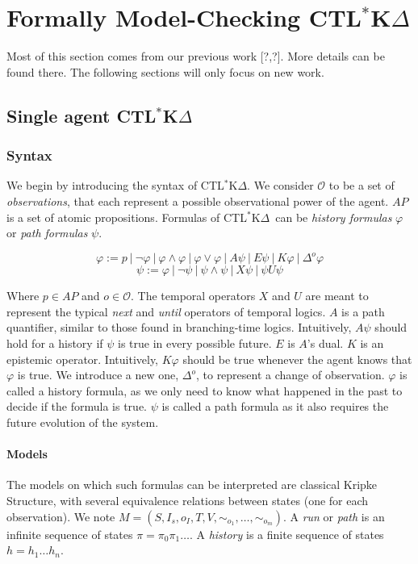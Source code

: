 \documentclass[dvipsnames]{acmart}
\def\ctlskd{CTL$^{*}$K$\Delta$}
\def\A{\mathit{A}}
\def\E{\mathit{E}}
\def\U{\mathit{U}}
\def\X{\mathit{X}}
\def\K{\mathit{K}}
\def\D#1{\Delta^{#1}}
\def\eqstate#1{\sim_{#1}}
\begin{document}
\section{Formally Model-Checking \ctlskd}
Most of this section comes from our previous work [?,?]. More details can be found there.
The following sections will only focus on new work.

\subsection{Single agent \ctlskd}
\subsubsection{Syntax}

We begin by introducing the syntax of \ctlskd. 
We consider $\mathcal{O}$ to be a set of \textit{observations}, that each represent a possible observational power of the agent. $\mathit{AP}$ is a set of atomic propositions.
Formulas of \ctlskd\ can be \textit{history formulas} $\varphi$ or \textit{path formulas} $\psi$.

$$\varphi := p ~|~ \neg \varphi ~|~ \varphi\wedge\varphi ~|~ \varphi\vee\varphi ~|~ \A\psi ~|~ \E\psi ~|~ \K\varphi ~|~ \D{o}\varphi$$
$$\psi := \varphi ~|~ \neg\psi ~|~ \psi\wedge\psi ~|~ \X\psi ~|~ \psi\U\psi$$

Where $p\in\mathit{AP}$ and $o\in\mathcal{O}$.
The temporal operators $\X$ and $\U$ are meant to represent the typical \textit{next} and \textit{until} operators of temporal logics.
$\A$ is a path quantifier, similar to those found in branching-time logics. Intuitively, $\A\psi$ should hold for a history if $\psi$ is true in every possible future. $\E$ is $\A$'s dual.
$\K$ is an epistemic operator. Intuitively, $\K\varphi$ should be true whenever the agent knows that $\varphi$ is true. We introduce a new one, $\D{o}$, to represent a change of observation.
$\varphi$ is called a history formula, as we only need to know what happened in the past to decide if the formula is true. $\psi$ is called a path formula as it also requires the future evolution of the system.

\paragraph{Models}
The models on which such formulas can be interpreted are classical Kripke Structure, with several equivalence relations between states (one for each observation). We note $M=(S,I_s,o_I,T,V,\eqstate{o_1},\dots,\eqstate{o_m})$.
A \textit{run} or \textit{path} is an infinite sequence of states $\pi=\pi_0\pi_1\dots$. A \textit{history} is a finite sequence of states $h=h_1\dots h_n$.
\end{document}
